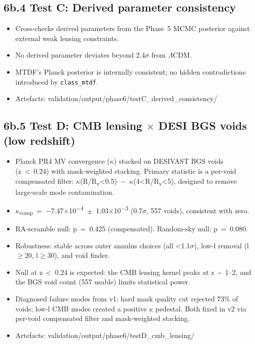 \documentclass[11pt,a4paper]{article}
\begin{document}
\subsection{6b.4 Test C: Derived parameter consistency}
\begin{itemize}
  \item Cross-checks derived parameters from the Phase~5 MCMC posterior against external weak lensing constraints.
  \item No derived parameter deviates beyond 2.4$\sigma$ from $\Lambda$CDM.
  \item MTDF's Planck posterior is internally consistent; no hidden contradictions introduced by \texttt{class\_\allowbreak{}mtdf}.
  \item Artefacts: validation/\allowbreak{}output/\allowbreak{}phase6/\allowbreak{}testC\_\allowbreak{}derived\_\allowbreak{}consistency/\allowbreak{}
\end{itemize}

\subsection{6b.5 Test D: CMB lensing $\times$ DESI BGS voids (low redshift)}
\begin{itemize}
  \item Planck PR4 MV convergence ($\kappa$) stacked on DESIVAST BGS voids (z~<~0.24) with mask-weighted stacking. Primary statistic is a per-void compensated filter: $\kappa$(R/\allowbreak{}R\textsubscript{v}<0.5)~$-$~$\kappa$(4<R/\allowbreak{}R\textsubscript{v}<5), designed to remove large-scale mode contamination.
  \item $\kappa$\textsubscript{comp}~=~$-$7.47$\times$10\textsuperscript{$-$4}~$\pm$~1.03$\times$10\textsuperscript{$-$3} (0.7$\sigma$, 557 voids), consistent with zero.
  \item RA-scramble null: p~=~0.425 (compensated). Random-sky null: p~=~0.080.
  \item Robustness: stable across outer annulus choices (all <1.1$\sigma$), low-l removal (l$\ge$20, l$\ge$30), and void finder.
  \item Null at z~<~0.24 is expected: the CMB lensing kernel peaks at z~\~{}~1--2, and the BGS void count (557 usable) limits statistical power.
  \item Diagnosed failure modes from v1: hard mask quality cut rejected 73\% of voids; low-l CMB modes created a positive $\kappa$ pedestal. Both fixed in v2 via per-void compensated filter and mask-weighted stacking.
  \item Artefacts: validation/\allowbreak{}output/\allowbreak{}phase6/\allowbreak{}testD\_\allowbreak{}cmb\_\allowbreak{}lensing/\allowbreak{}
\end{itemize}
\end{document}
